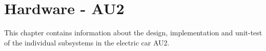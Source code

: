 \chapter{Hardware - AU2}
This chapter contains information about the design, implementation and unit-test of the individual subsystems in the electric car AU2.

